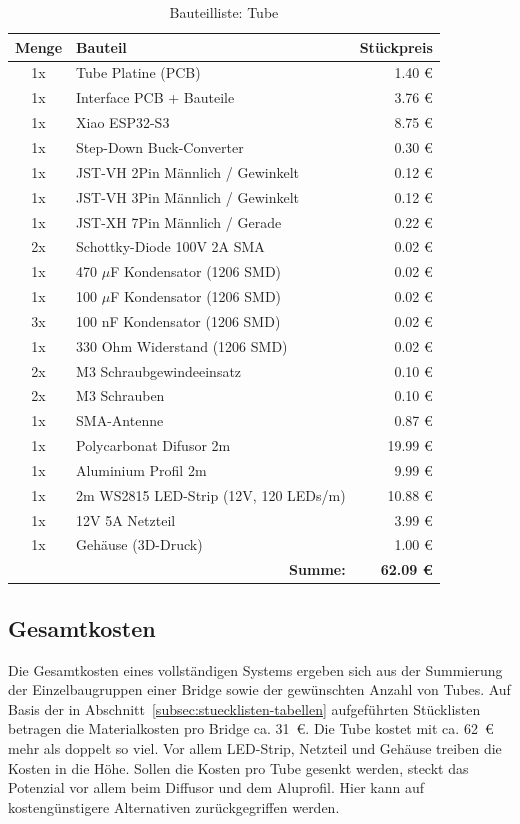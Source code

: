 \begin{table}[H]
    \centering
    \begin{tabular}{|c|l|r|}
        \hline
        \textbf{Menge} & \textbf{Bauteil} & \textbf{Stückpreis} \\ \hline
        1x & Tube Platine (PCB) & 1.40 € \\ \hline
        1x & Interface PCB + Bauteile & 3.76 € \\ \hline
        1x & Xiao ESP32-S3 & 8.75 € \\ \hline
        1x & Step-Down Buck-Converter & 0.30 € \\ \hline
        1x & JST-VH 2Pin Männlich / Gewinkelt & 0.12 € \\ \hline
        1x & JST-VH 3Pin Männlich / Gewinkelt & 0.12 € \\ \hline
        1x & JST-XH 7Pin Männlich / Gerade & 0.22 € \\ \hline
        2x & Schottky-Diode 100V 2A SMA & 0.02 € \\ \hline
        1x & 470 $\mu$F Kondensator (1206 SMD) & 0.02 € \\ \hline
        1x & 100 $\mu$F Kondensator (1206 SMD) & 0.02 € \\ \hline
        3x & 100 nF Kondensator (1206 SMD) & 0.02 € \\ \hline
        1x & 330 Ohm Widerstand (1206 SMD) & 0.02 € \\ \hline
        2x & M3 Schraubgewindeeinsatz & 0.10 € \\ \hline
        2x & M3 Schrauben & 0.10 € \\ \hline
        1x & SMA-Antenne & 0.87 € \\ \hline
        1x & Polycarbonat Difusor 2m & 19.99 € \\ \hline
        1x & Aluminium Profil 2m & 9.99 € \\ \hline
        1x & 2m WS2815 LED-Strip (12V, 120 LEDs/m) & 10.88 € \\ \hline
        1x & 12V 5A Netzteil & 3.99 € \\ \hline
        1x & Gehäuse (3D-Druck) & 1.00 € \\ \hline
        \multicolumn{2}{|r|}{\textbf{Summe:}} & \textbf{62.09 €} \\ \hline
    \end{tabular}
    \caption{Bauteilliste: Tube}
    \label{tab:bauteile_tube}
\end{table}

\subsection{Gesamtkosten}
\label{subsec:gesamtkosten}

Die Gesamtkosten eines vollständigen Systems ergeben sich aus
der Summierung der Einzelbaugruppen einer Bridge sowie der
gewünschten Anzahl von Tubes. Auf Basis der in
Abschnitt~\ref{subsec:stuecklisten-tabellen} aufgeführten
Stücklisten betragen die Materialkosten pro Bridge ca. 31~€.
Die Tube kostet mit ca. 62~€ mehr als doppelt so viel.
Vor allem LED-Strip, Netzteil und Gehäuse treiben die Kosten in die Höhe.
Sollen die Kosten pro Tube gesenkt werden, steckt das Potenzial 
vor allem beim Diffusor und dem Aluprofil. Hier kann auf kostengünstigere 
Alternativen zurückgegriffen werden.